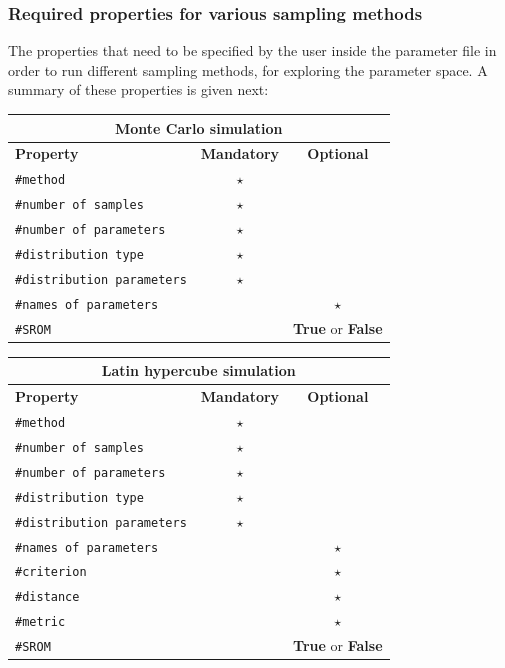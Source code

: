 \subsubsection{Required properties for various sampling methods}

The properties that need to be specified by the user inside the parameter file in order to run different sampling methods, for exploring the parameter space. A summary of these properties  is given next:  

\begin{center}
	\begin{tabular}{ |l|c|c| } 
		\hline
		\multicolumn{3}{|c|}{\textbf{Monte Carlo simulation}} \\
		\hline
		\textbf{Property} & \textbf{Mandatory} & \textbf{Optional} \\
		\hline
		 \texttt{\#method}& $\star$ &   \\ 
		\hline
		\texttt{\#number of samples}& $\star$ &   \\ 
		\hline
		\texttt{\#number of parameters}& $\star$  &   \\ 
		\hline
		\texttt{\#distribution type}& $\star$ &   \\ 
		\hline
		\texttt{\#distribution parameters} & $\star$ &   \\ 
		\hline
		\texttt{\#names of parameters}& & $\star$   \\ 
		\hline
		\texttt{\#SROM}&  & \textbf{True} or \textbf{False}  \\ 
		\hline
	\end{tabular}
\end{center}

\begin{center}
	\begin{tabular}{ |l|c|c| } 
				\hline
		\multicolumn{3}{|c|}{\textbf{Latin hypercube simulation}} \\
		\hline
		\textbf{Property} & \textbf{Mandatory} & \textbf{Optional} \\
		\hline
		\texttt{\#method}& $\star$ &   \\ 
		\hline
		\texttt{\#number of samples}& $\star$ &   \\ 
		\hline
		\texttt{\#number of parameters}&  $\star$  &   \\ 
		\hline
		\texttt{\#distribution type}& $\star$ &   \\ 
		\hline
		\texttt{\#distribution parameters} & $\star$ &   \\ 
		\hline
		\texttt{\#names of parameters}& & $\star$   \\ 
		\hline
		\texttt{\#criterion}& & $\star$   \\ 
		\hline
		\texttt{\#distance}& & $\star$   \\ 
		\hline
		\texttt{\#metric}& & $\star$   \\ 
		\hline
				\texttt{\#SROM}&  & \textbf{True} or \textbf{False}    \\ 
		\hline
	\end{tabular}
\end{center}

